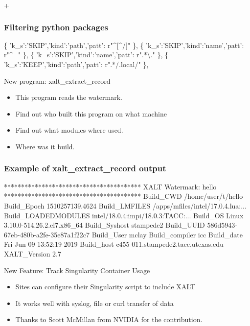 +\documentclass{beamer}
\begin{document}
\begin{frame}[fragile]
    \frametitle{Filtering python packages}
 {\small
    \begin{semiverbatim}
\{ 'k\_s':'SKIP','kind':'path','patt': r"^[^/]" \},
\{ 'k\_s':'SKIP','kind':'name','patt': r"^_"    \},
\{ 'k\_s':'SKIP','kind':'name','patt': r".*\textbackslash." \},
\{ 'k\_s':'KEEP','kind':'path','patt': r".*/.local/" \},
    \end{semiverbatim}
}
\end{frame}

\begin{frame}{New program: xalt\_extract\_record}
  \begin{itemize}
    \item This program reads the watermark.
    \item Find out who built this program on what machine
    \item Find out what modules where used.
    \item Where was it build. 
  \end{itemize}
\end{frame}

\begin{frame}[fragile]
    \frametitle{Example of xalt\_extract\_record output}
 {\tiny
    \begin{semiverbatim}
****************************************
XALT Watermark: hello
****************************************
Build\_CWD            /home/user/t/hello
Build\_Epoch          1510257139.4624
Build\_LMFILES        /apps/mfiles/intel/17.0.4.lua:...
Build\_LOADEDMODULES  intel/18.0.4:impi/18.0.3:TACC:...
Build\_OS             Linux 3.10.0-514.26.2.el7.x86_64
Build\_Syshost        stampede2
Build\_UUID           586d5943-67eb-480b-a2fe-35e87a1f22c7
Build\_User           mclay
Build\_compiler       icc
Build\_date           Fri Jun 09 13:52:19 2019
Build\_host           c455-011.stampede2.tacc.utexas.edu
XALT\_Version         2.7
    \end{semiverbatim}
}
\end{frame}

\begin{frame}{New Feature: Track Singularity Container Usage}
  \begin{itemize}
    \item Sites can configure their Singularity script to include XALT
    \item It works well with syslog, file  or curl transfer of data
    \item Thanks to Scott McMillan from NVIDIA for the contribution.
  \end{itemize}
\end{frame}
\end{document}

